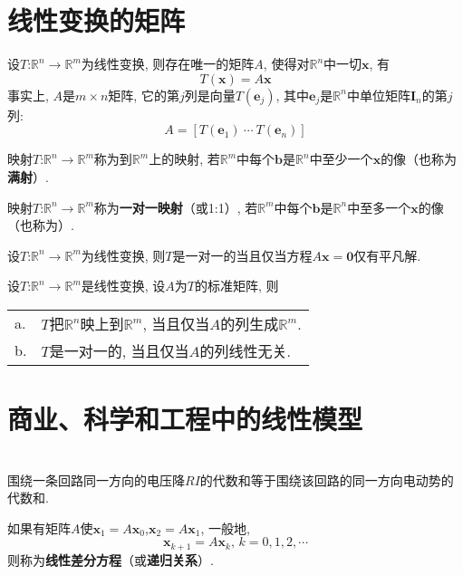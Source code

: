 \section{线性变换的矩阵}
\begin{TheoremOne}
设$T$:$\mathbb{R}^n\rightarrow\mathbb{R}^m$为线性变换, 则存在唯一的矩阵$A$, 使得对$\mathbb{R}^n$中一切$\bm{x}$, 有
\[T(\bm{x})=A\bm{x}\]
事实上, $A$是$m\times n$矩阵, 它的第$j$列是向量$T(\bm{e}_j)$, 其中$\bm{e}_j$是$\mathbb{R}^n$中单位矩阵$\bm{I}_n$的第$j$列:
\[A=[T(\bm{e}_1)\ \cdots\ T(\bm{e}_n)]\]
\end{TheoremOne}\vspace{4ex}

\begin{definition}
映射$T$:$\mathbb{R}^n\rightarrow\mathbb{R}^m$称为到$\mathbb{R}^m$上的映射, 若$\mathbb{R}^m$中每个$\bm{b}$是$\mathbb{R}^n$中至少一个$\bm{x}$的像（也称为\textbf{满射}）.
\end{definition}\vspace{4ex}

\begin{definition}
映射$T$:$\mathbb{R}^n\rightarrow\mathbb{R}^m$称为\textbf{一对一映射}（或1:1）, 若$\mathbb{R}^m$中每个$\bm{b}$是$\mathbb{R}^n$中至多一个$\bm{x}$的像（也称为）.
\end{definition}\vspace{4ex}

\begin{TheoremOne}
设$T$:$\mathbb{R}^n\rightarrow\mathbb{R}^m$为线性变换, 则$T$是一对一的当且仅当方程$A\bm{x}=\bm{0}$仅有平凡解.
\end{TheoremOne}\vspace{4ex}

\begin{TheoremOne}
设$T$:$\mathbb{R}^n\rightarrow\mathbb{R}^m$是线性变换, 设$A$为$T$的标准矩阵, 则\\
\begin{tabular}{l@{\ }l}
a. & $T$把$\mathbb{R}^n$映上到$\mathbb{R}^m$, 当且仅当$A$的列生成$\mathbb{R}^m$.\\
b. & $T$是一对一的, 当且仅当$A$的列线性无关.
\end{tabular}
\end{TheoremOne}\vspace{6ex}

\section{商业、科学和工程中的线性模型}
\begin{law}[基尔霍夫电压定律]\ \\
围绕一条回路同一方向的电压降$RI$的代数和等于围绕该回路的同一方向电动势的代数和.
\end{law}\vspace{4ex}

\begin{law}
如果有矩阵$A$使$\bm{x}_1=A\bm{x}_0$,$\bm{x}_2=A\bm{x}_1$, 一般地,
\[\bm{x}_{k+1}=A\bm{x}_k\text{,\ }k=0,1,2,\cdots\]
则称为\textbf{线性差分方程}（或\textbf{递归关系}）.
\end{law}
